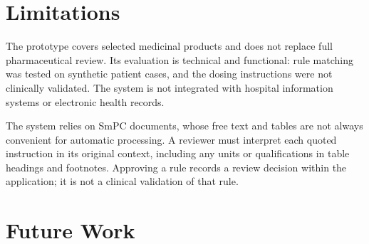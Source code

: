 \documentclass[12pt,a4paper,twoside]{book}
\begin{document}
\section{Limitations}\label{sec:limitations}

The prototype covers selected medicinal products and does not replace full pharmaceutical review.
Its evaluation is technical and functional: rule matching was tested on synthetic patient cases, and the dosing instructions were not clinically validated.
The system is not integrated with hospital information systems or electronic health records.

The system relies on SmPC documents, whose free text and tables are not always convenient for automatic processing.
A reviewer must interpret each quoted instruction in its original context, including any units or qualifications in table headings and footnotes.
Approving a rule records a review decision within the application; it is not a clinical validation of that rule.

\section{Future Work}\label{sec:future-work}





\appendix

\renewcommand*\listfigurename{List of figures} 
\hypersetup{linkcolor=black}
\listoffigures

\renewcommand*\listtablename{List of tables} 
\hypersetup{linkcolor=black}
\listoftables
\end{document}
